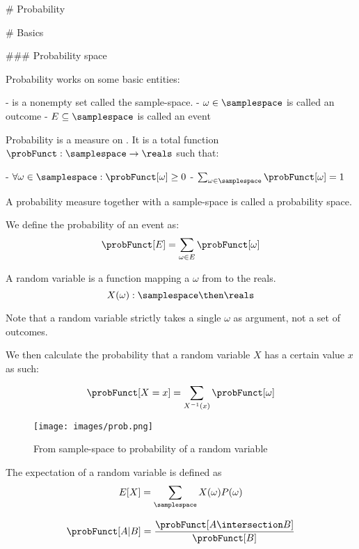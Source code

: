 # Probability

# Basics

### Probability space

Probability works on some basic entities:

    - \samplespace is a nonempty set called the sample-space. 
    - $\omega \in \samplespace$ is called an outcome
    - $E \subseteq \samplespace$ is called an event



\begin{definition}[Probability]
    Probability is a measure on \samplespace. It is a total function $ \probFunct: \samplespace \to \reals $ such that:
    
        - $ \forall \omega \in \samplespace : \probFunct[\omega] \geq 0 $
        - $ \sum_{\omega \in \samplespace} \probFunct[\omega] = 1 $
    
\end{definition}

A probability measure together with a sample-space is called a probability space. 


We define the probability of an event as: 
$$ \probFunct[E] = \sum_{\omega \in E} \probFunct[\omega] $$

\begin{definition}
    A random variable is a function mapping a $\omega$ from \samplespace  to the reals. 
    $$ X(\omega) : \samplespace \then \reals $$
\end{definition}
Note that a random variable strictly takes a single $\omega$ as argument, not a set of outcomes. 

We then calculate the probability that a random variable $X$ has a certain value $x$ as such: 

$$ \probFunct[X=x] = \sum_{X^{-1}(x)} \probFunct[\omega] $$


\begin{figure}[H]
    \caption{From sample-space to probability of a random variable}
    \centering
      \texttt{[image: images/prob.png]}
\end{figure}


\begin{definition}[Expectation]
    The expectation of a random variable is defined as 
    $$ E[X] = \sum_\samplespace X(\omega)P(\omega)$$ 
\end{definition}

\begin{definition}
    $$ \probFunct[A | B] = \frac{\probFunct[A \intersection B]}{\probFunct[B]}$$
\end{definition}

